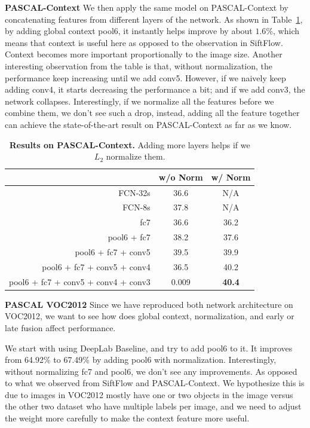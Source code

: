 \documentclass{article} %
\begin{document}
\noindent\textbf{PASCAL-Context} We then apply the same model on PASCAL-Context by concatenating features from different layers of the network. As shown in Table~\ref{tab:pascalcontext}, by adding global context pool6, it instantly helps improve by about $1.6\%$, which means that context is useful here as opposed to the observation in SiftFlow. Context becomes more important proportionally to the image size. Another interesting observation from the table is that, without normalization, the performance keep increasing until we add conv5. However, if we naively keep adding conv4, it starts decreasing the performance a bit; and if we add conv3, the network collapses. Interestingly, if we normalize all the features before we combine them, we don't see such a drop, instead, adding all the feature together can achieve the state-of-the-art result on PASCAL-Context as far as we know.
\begin{table}[!htb]\small
	\centering
	\begin{tabular}{r|c|c}
		& w/o Norm & w/ Norm\\
		\hline\hline
		FCN-32s & 36.6 & N/A\\
		FCN-8s & 37.8 & N/A\\
		\hline
		fc7 & 36.6 & 36.2\\
		pool6 + fc7 & 38.2 & 37.6\\
		pool6 + fc7 + conv5 & 39.5 & 39.9\\
		pool6 + fc7 + conv5 + conv4 & 36.5 & 40.2\\
		pool6 + fc7 + conv5 + conv4 + conv3 & 0.009 & \textbf{40.4}\\
		\hline
	\end{tabular}
	\caption{\textbf{Results on PASCAL-Context.} Adding more layers helps if we $L_2$ normalize them.}\label{tab:pascalcontext}
\end{table}
\vspace{-0.5em}

\noindent\textbf{PASCAL VOC2012} Since we have reproduced both network architecture on VOC2012, we want to see how does global context, normalization, and early or late fusion affect performance.

We start with using DeepLab Baseline, and try to add pool6 to it. It improves from 64.92\% to 67.49\% by adding pool6 with normalization. Interestingly, without normalizing fc7 and pool6, we don't see any improvements. As opposed to what we observed from SiftFlow and PASCAL-Context. We hypothesize this is due to images in VOC2012 mostly have one or two objects in the image versus the other two dataset who have multiple labels per image, and we need to adjust the weight more carefully to make the context feature more useful.
\end{document}
